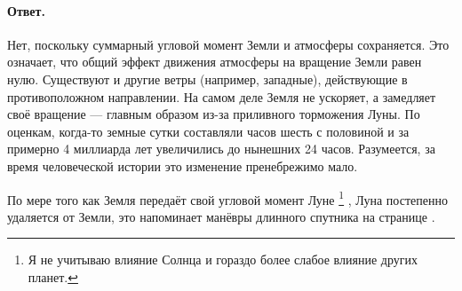 \paragraph{Ответ.}
Нет, поскольку суммарный угловой момент Земли и атмосферы сохраняется.
Это означает, что общий эффект движения атмосферы на вращение Земли равен нулю.
Существуют и другие ветры (например, западные), действующие в противоположном направлении.
На самом деле Земля не ускоряет, а замедляет своё вращение — главным образом из-за приливного торможения Луны.
По оценкам, когда-то земные сутки составляли часов шесть с половиной и за примерно 4 миллиарда лет увеличились до нынешних 24 часов.
Разумеется, за время человеческой истории это изменение пренебрежимо мало.

По мере того как Земля передаёт свой угловой момент Луне%
\footnote{Я не учитываю влияние Солнца и гораздо более слабое влияние других планет.}%
, Луна постепенно удаляется от Земли, это напоминает манёвры длинного спутника на странице \pageref{Управление спутником}.
